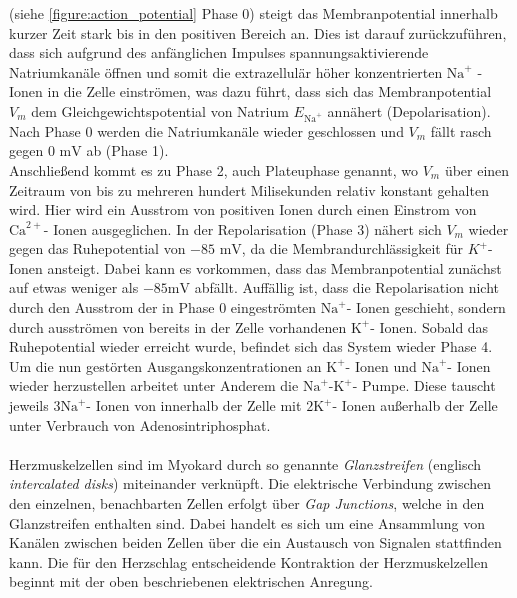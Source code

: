 \documentclass[
	a4paper,			%
	11pt,				%
	headsepline,		%
	bibtotoc,			%
	BCOR18mm,      		%
	DIV14,				%
	headings=normal,
	numbers=noenddot,
]{scrbook}
\theoremstyle{mythmstyle}
\theoremstyle{other}
\begin{document}
	 (siehe \autoref{figure:action_potential} Phase 0) steigt das Membranpotential innerhalb kurzer Zeit stark 
	 bis in den positiven Bereich an. Dies ist darauf zurückzuführen, dass sich aufgrund des anfänglichen
	 Impulses spannungsaktivierende Natriumkanäle öffnen und somit die extrazellulär höher konzentrierten
	 $\mathrm{Na}^+$ - Ionen in die Zelle einströmen, was  dazu führt, dass sich das Membranpotential $V_m$ 
	 dem Gleichgewichtspotential von Natrium $E_{\mathrm{Na}^+}$ annähert (Depolarisation).
	  \\
	 Nach Phase 0 werden die Natriumkanäle wieder geschlossen und $V_m$ fällt  rasch gegen $0\text{ mV}$ ab 
	 (Phase 1).\\
	 Anschließend kommt es zu Phase 2, auch Plateuphase genannt, wo $V_m$ über einen Zeitraum von bis zu mehreren
	 hundert Milisekunden relativ konstant gehalten wird. Hier wird ein Ausstrom von positiven Ionen
	 durch einen Einstrom von $\mathrm{Ca}^{2+}$- Ionen ausgeglichen. 
	 In der Repolarisation (Phase 3) nähert sich $V_m$ wieder gegen das Ruhepotential
	 von $-85\text{ mV}$, da die Membrandurchlässigkeit für $K^+$- Ionen ansteigt. Dabei kann es vorkommen,
	 dass das Membranpotential zunächst auf etwas weniger als $-85 \text{mV}$ abfällt.
	 Auffällig ist, dass die Repolarisation nicht durch den Ausstrom der in Phase 0 eingeströmten
	 $\mathrm{Na}^+$- Ionen geschieht, sondern durch ausströmen von bereits in der Zelle
	 vorhandenen $\mathrm{K}^+$- Ionen. Sobald das Ruhepotential
	 wieder erreicht wurde, befindet sich das System wieder Phase 4. Um die nun gestörten Ausgangskonzentrationen
	 an $\mathrm{K}^+$- Ionen und $\mathrm{Na}^+$- Ionen wieder herzustellen arbeitet unter Anderem
	 die $\mathrm{Na}^+\text{-}\mathrm{K}^+$- Pumpe. Diese tauscht jeweils $3 \mathrm{Na}^+$- Ionen 
	 von innerhalb der Zelle mit $2 \mathrm{K}^+$- Ionen außerhalb der Zelle unter Verbrauch von 
	 Adenosintriphosphat.
	 \cite{action_potential}\cite[S.~23-25]{modelling}\\\\
	Herzmuskelzellen sind im Myokard durch so genannte \emph{Glanzstreifen} (englisch \emph{intercalated disks})
	miteinander verknüpft. Die elektrische Verbindung zwischen den einzelnen, benachbarten Zellen erfolgt
	über \emph{Gap Junctions}, welche in den Glanzstreifen enthalten sind. Dabei handelt es sich um eine
	Ansammlung von Kanälen zwischen beiden Zellen über die ein Austausch von Signalen stattfinden kann. Die für 
	den Herzschlag entscheidende Kontraktion der Herzmuskelzellen beginnt mit der oben beschriebenen elektrischen
	Anregung.
	
\end{document}
